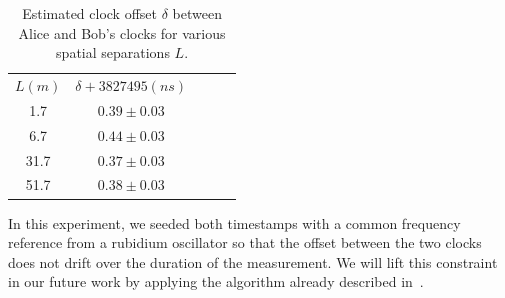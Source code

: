 \documentclass[aps,pra,onecolumn, superscriptaddress]{revtex4}
\begin{document}
\begin{table}[htbp] 
\centering
\label{table:offsets}
\begin{tabular}{cclll}
$L(m)$ & $\delta + 3827495(ns)$\\
 1.7 & $0.39\pm0.03$\\
 6.7 & $0.44\pm0.03$ \\
 31.7 & $0.37\pm0.03$\\
 51.7 & $0.38\pm0.03$
\end{tabular}
\caption{Estimated clock offset $\delta$ between Alice and Bob's clocks for various spatial separations $L$.}
\end{table}

In this experiment, we seeded both timestamps with a common frequency reference from a rubidium oscillator so that the offset between the two clocks does not drift over the duration of the measurement.
We will lift this constraint in our future work by applying the algorithm already described in~\cite{Ho2009}.
     
\end{document}
